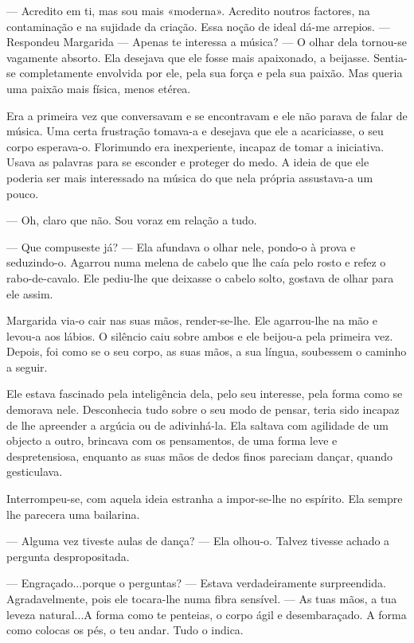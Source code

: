 --- Acredito em ti, mas sou mais «moderna». Acredito noutros factores, na
contaminação e na sujidade da criação. Essa noção de ideal dá-me
arrepios. --- Respondeu Margarida --- Apenas te interessa a música? --- O
olhar dela tornou-se vagamente absorto. Ela desejava que ele fosse mais
apaixonado, a beijasse. Sentia-se completamente envolvida por ele, pela
sua força e pela sua paixão. Mas queria uma paixão mais física, menos
etérea.

Era a primeira vez que conversavam e se encontravam e ele não parava de
falar de música. Uma certa frustração tomava-a e desejava que ele a
acariciasse, o seu corpo esperava-o. Florimundo era inexperiente,
incapaz de tomar a iniciativa. Usava as palavras para se esconder e
proteger do medo. A ideia de que ele poderia ser mais interessado na
música do que nela própria assustava-a um pouco.

--- Oh, claro que não. Sou voraz em relação a tudo.

--- Que compuseste já? --- Ela afundava o olhar nele, pondo-o à prova e
seduzindo-o. Agarrou numa melena de cabelo que lhe caía pelo rosto e
refez o rabo-de-cavalo. Ele pediu-lhe que deixasse o cabelo solto,
gostava de olhar para ele assim.

Margarida via-o cair nas suas mãos, render-se-lhe. Ele agarrou-lhe na
mão e levou-a aos lábios. O silêncio caiu sobre ambos e ele beijou-a
pela primeira vez. Depois, foi como se o seu corpo, as suas mãos, a sua
língua, soubessem o caminho a seguir.

Ele estava fascinado pela inteligência dela, pelo seu interesse, pela
forma como se demorava nele. Desconhecia tudo sobre o seu modo de
pensar, teria sido incapaz de lhe apreender a argúcia ou de adivinhá-la.
Ela saltava com agilidade de um objecto a outro, brincava com os
pensamentos, de uma forma leve e despretensiosa, enquanto as suas mãos
de dedos finos pareciam dançar, quando gesticulava.

Interrompeu-se, com aquela ideia estranha a impor-se-lhe no espírito.
Ela sempre lhe parecera uma bailarina.

--- Alguma vez tiveste aulas de dança? --- Ela olhou-o. Talvez tivesse
achado a pergunta despropositada.

--- Engraçado...porque o perguntas? --- Estava verdadeiramente surpreendida.
Agradavelmente, pois ele tocara-lhe numa fibra sensível. --- As tuas mãos,
a tua leveza natural...A forma como te penteias, o corpo ágil e
desembaraçado. A forma como colocas os pés, o teu andar. Tudo o indica.

